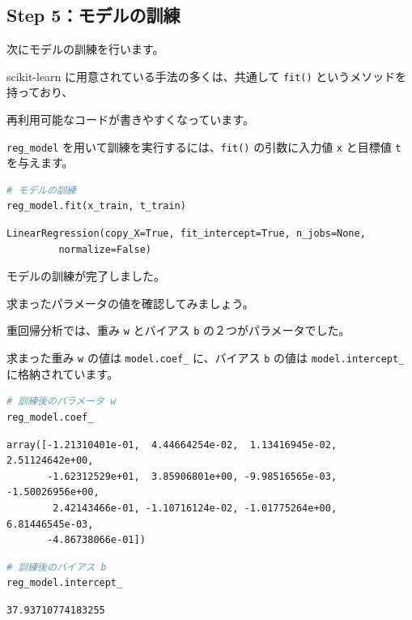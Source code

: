 \subsection{Step 5：モデルの訓練}


次にモデルの訓練を行います。

scikit-learn に用意されている手法の多くは、共通して \texttt{fit()} というメソッドを持っており、

再利用可能なコードが書きやすくなっています。


\texttt{reg\_model} を用いて訓練を実行するには、\texttt{fit()} の引数に入力値 \texttt{x} と目標値 \texttt{t} を与えます。


\begin{lstlisting}[style=codecell,language=Python]
# モデルの訓練
reg_model.fit(x_train, t_train)
\end{lstlisting}

\begin{lstlisting}[style=outputcell]
LinearRegression(copy_X=True, fit_intercept=True, n_jobs=None,
         normalize=False)
\end{lstlisting}

モデルの訓練が完了しました。

求まったパラメータの値を確認してみましょう。

重回帰分析では、重み \texttt{w} とバイアス \texttt{b} の２つがパラメータでした。

求まった重み \texttt{w} の値は \texttt{model.coef\_} に、バイアス \texttt{b} の値は \texttt{model.intercept\_} に格納されています。


\begin{lstlisting}[style=codecell,language=Python]
# 訓練後のパラメータ w
reg_model.coef_
\end{lstlisting}

\begin{lstlisting}[style=outputcell]
array([-1.21310401e-01,  4.44664254e-02,  1.13416945e-02,  2.51124642e+00,
       -1.62312529e+01,  3.85906801e+00, -9.98516565e-03, -1.50026956e+00,
        2.42143466e-01, -1.10716124e-02, -1.01775264e+00,  6.81446545e-03,
       -4.86738066e-01])
\end{lstlisting}

\begin{lstlisting}[style=codecell,language=Python]
# 訓練後のバイアス b
reg_model.intercept_
\end{lstlisting}

\begin{lstlisting}[style=outputcell]
37.93710774183255
\end{lstlisting}

